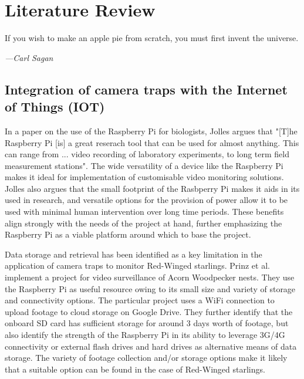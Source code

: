 \documentclass[class=report,11pt,crop=false]{standalone}
\begin{document}
\ifstandalone
\tableofcontents
\fi
\chapter{Literature Review \label{ch:literature}}
\epigraph{If you wish to make an apple pie from scratch, you must first invent the universe.}%
    {\emph{---Carl Sagan}}
\vspace{0.5cm}

\section{Integration of camera traps with the Internet of Things (IOT)}

In a paper on the use of the Raspberry Pi for biologists, Jolles \cite{Jolles-Broad-scale} argues that "[T]he Raspberry Pi [is] a great reserach tool that can be used for almost anything. This can range from ... video recording of laboratory experiments, to long term field measurement stations". The wide versatility of a device like the Raspberry Pi makes it ideal for implementation of customisable video monitoring solutions. Jolles \cite{Jolles-Broad-scale} also argues that the small footprint of the Rasbperry Pi makes it aids in its used in research, and versatile options for the provision of power allow it to be used with minimal human intervention over long time periods. These benefits align strongly with the needs of the project at hand, further emphasizing the Raspberry Pi as a viable platform around which to base the project.

Data storage and retrieval has been identified as a key limitation in the application of camera traps to monitor Red-Winged starlings. Prinz et al. \cite{Prinz-ANovel} implement a project for video surveillance of Acorn Woodpecker nests. They use the Raspberry Pi as useful resource owing to its small size and variety of storage and connectivity options. The particular project uses a WiFi connection to upload footage to cloud storage on Google Drive. They further identify that the onboard SD card has sufficient storage for around 3 days worth of footage, but also identify the strength of the Raspberry Pi in its ability to leverage 3G/4G connectivity or external flash drives and hard drives as alternative means of data storage.  The variety of footage collection and/or storage options make it likely that a suitable option can be found in the case of Red-Winged starlings.
\end{document}
